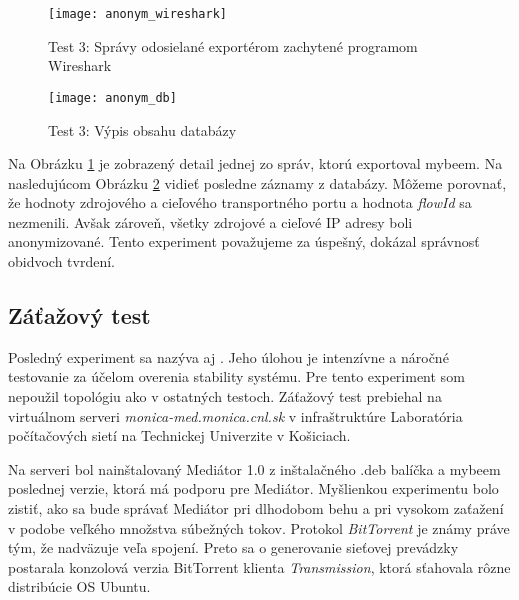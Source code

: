 \begin{figure}[ht!]
\centering
\texttt{[image: anonym\_wireshark]}
\caption{Test 3: Správy odosielané exportérom zachytené programom Wireshark}\label{o:anonym_wireshark}
\end{figure}

\begin{figure}[ht!]
\centering
\texttt{[image: anonym\_db]}
\caption{Test 3: Výpis obsahu databázy}\label{o:anonym_db}
\end{figure}


Na Obrázku \ref{o:anonym_wireshark} je zobrazený detail jednej zo správ, ktorú exportoval mybeem. 
Na nasledujúcom Obrázku \ref{o:anonym_db} vidieť posledne záznamy z databázy. Môžeme porovnať, že hodnoty 
zdrojového a cieľového transportného portu a hodnota \emph{flowId} sa nezmenili. Avšak zároveň, všetky 
zdrojové a cieľové IP adresy boli anonymizované. Tento experiment považujeme za úspešný, dokázal správnosť 
obidvoch tvrdení.


\subsection{Záťažový test}

Posledný experiment sa nazýva aj . Jeho úlohou je intenzívne a náročné testovanie 
za účelom overenia stability systému. Pre tento experiment som nepoužil topológiu ako v ostatných testoch.
Záťažový test prebiehal na virtuálnom serveri \emph{monica-med.monica.cnl.sk} v infraštruktúre Laboratória
počítačových sietí na Technickej Univerzite v Košiciach.

Na serveri bol nainštalovaný Mediátor 1.0 z inštalačného .deb balíčka a mybeem poslednej verzie, ktorá 
má podporu pre Mediátor. Myšlienkou experimentu bolo zistiť, ako sa bude správať Mediátor pri dlhodobom 
behu a pri vysokom zaťažení v podobe veľkého množstva súbežných tokov. Protokol \emph{BitTorrent}
\citep{bittorrent} je známy práve tým, že nadväzuje veľa spojení. Preto sa o generovanie sieťovej 
prevádzky postarala konzolová verzia BitTorrent klienta \emph{Transmission}, ktorá sťahovala rôzne 
distribúcie OS Ubuntu.

